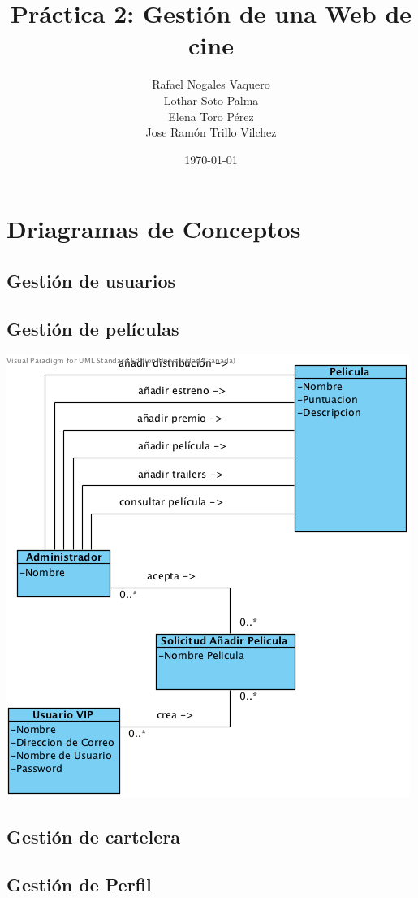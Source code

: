 \documentclass{article}
\title{Práctica 2: Gestión de una Web de cine}
\author{Rafael Nogales Vaquero
\\Lothar Soto Palma
\\Elena Toro Pérez
\\Jose Ramón Trillo Vilchez}
\date{\today}
\begin{document}
\maketitle
\section{Driagramas de Conceptos}
	\subsection*{Gestión de usuarios}
	\subsection*{Gestión de películas}
	
	\includegraphics[width=1\linewidth]{./C-GestionDePeliculas}
	
	\subsection*{Gestión de cartelera}
	\subsection*{Gestión de Perfil}
\end{document}
